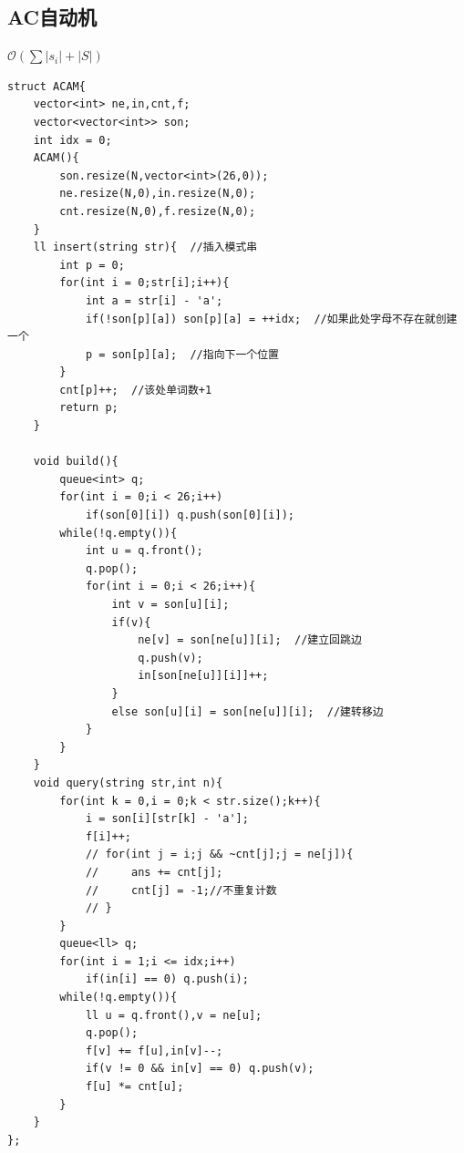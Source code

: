 \subsection{AC自动机}
$\mathcal O(\sum|s_i|+|S|)$
\begin{lstlisting}[caption={}]
struct ACAM{
    vector<int> ne,in,cnt,f;
    vector<vector<int>> son;
    int idx = 0;
    ACAM(){
        son.resize(N,vector<int>(26,0));
        ne.resize(N,0),in.resize(N,0);
        cnt.resize(N,0),f.resize(N,0);
    }
    ll insert(string str){  //插入模式串
        int p = 0;
        for(int i = 0;str[i];i++){
            int a = str[i] - 'a';
            if(!son[p][a]) son[p][a] = ++idx;  //如果此处字母不存在就创建一个 
            p = son[p][a];  //指向下一个位置 
        }
        cnt[p]++;  //该处单词数+1 
        return p;
    }

    void build(){
        queue<int> q;
        for(int i = 0;i < 26;i++)
            if(son[0][i]) q.push(son[0][i]);
        while(!q.empty()){
            int u = q.front();
            q.pop();
            for(int i = 0;i < 26;i++){
                int v = son[u][i];
                if(v){
                    ne[v] = son[ne[u]][i];  //建立回跳边
                    q.push(v);
                    in[son[ne[u]][i]]++;
                }
                else son[u][i] = son[ne[u]][i];  //建转移边
            }
        }
    }
    void query(string str,int n){
        for(int k = 0,i = 0;k < str.size();k++){
            i = son[i][str[k] - 'a'];
            f[i]++;
            // for(int j = i;j && ~cnt[j];j = ne[j]){
            //     ans += cnt[j];
            //     cnt[j] = -1;//不重复计数
            // }
        }
        queue<ll> q;
        for(int i = 1;i <= idx;i++)
            if(in[i] == 0) q.push(i);
        while(!q.empty()){
            ll u = q.front(),v = ne[u];
            q.pop();
            f[v] += f[u],in[v]--;
            if(v != 0 && in[v] == 0) q.push(v);
            f[u] *= cnt[u];
        }
    }
};
\end{lstlisting}

